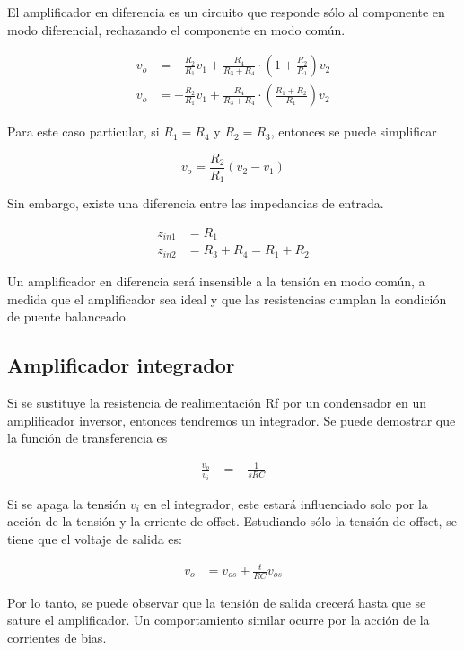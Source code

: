 El amplificador en diferencia es un circuito que responde sólo al componente en modo diferencial, rechazando el componente en modo común.

\begin{align*}
v_o &= -\frac{R_2}{R_1} v_1 + \frac{R_4}{R_3 + R_4} \cdot \left( 1 + \frac{R_2}{R_1} \right) v_2 \\
v_o &= -\frac{R_2}{R_1} v_1 + \frac{R_4}{R_3 + R_4} \cdot \left( \frac{R_1 + R_2}{R_1} \right) v_2
\end{align*}

Para este caso particular, si $R_1 = R_4$ y $R_2 = R_3$, entonces se puede
simplificar

\begin{equation}
    \boxed{v_o = \frac{R_2}{R_1} (v_2 - v_1)}
    \label{eq:mt-ganancia-restador}
\end{equation}

Sin embargo, existe una diferencia entre las impedancias de entrada.

\begin{align*}
z_{in1} &= R_1 \\
z_{in2} &= R_3 + R_4 = R_1 + R_2
\end{align*}


Un amplificador en diferencia será insensible a la tensión en modo común,
a medida que el amplificador sea ideal y que las resistencias cumplan la
condición de puente balanceado.

\subsection{Amplificador integrador}

Si se sustituye la resistencia de realimentación Rf por un condensador en un amplificador inversor, entonces tendremos un integrador. Se puede demostrar que la función de transferencia es

\begin{align*}
\frac{v_o}{v_i} &= -\frac{1}{sRC}
\end{align*}

Si se apaga la tensión $v_i$ en el integrador, este estará influenciado solo por la acción de la tensión y la crriente de offset. Estudiando sólo la tensión de offset, se tiene que el voltaje de salida es:

\begin{align*}
v_o &= v_{os} + \frac{t}{RC} v_{os}
\end{align*}

Por lo tanto, se puede observar que la tensión de salida crecerá hasta que se sature el amplificador. Un comportamiento similar ocurre por la acción de la corrientes de bias.


